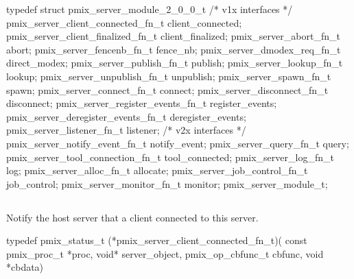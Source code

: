 \cspecificstart
\begin{codepar}
typedef struct pmix_server_module_2_0_0_t {
    /* v1x interfaces */
    pmix_server_client_connected_fn_t   client_connected;
    pmix_server_client_finalized_fn_t   client_finalized;
    pmix_server_abort_fn_t              abort;
    pmix_server_fencenb_fn_t            fence_nb;
    pmix_server_dmodex_req_fn_t         direct_modex;
    pmix_server_publish_fn_t            publish;
    pmix_server_lookup_fn_t             lookup;
    pmix_server_unpublish_fn_t          unpublish;
    pmix_server_spawn_fn_t              spawn;
    pmix_server_connect_fn_t            connect;
    pmix_server_disconnect_fn_t         disconnect;
    pmix_server_register_events_fn_t    register_events;
    pmix_server_deregister_events_fn_t  deregister_events;
    pmix_server_listener_fn_t           listener;
    /* v2x interfaces */
    pmix_server_notify_event_fn_t       notify_event;
    pmix_server_query_fn_t              query;
    pmix_server_tool_connection_fn_t    tool_connected;
    pmix_server_log_fn_t                log;
    pmix_server_alloc_fn_t              allocate;
    pmix_server_job_control_fn_t        job_control;
    pmix_server_monitor_fn_t            monitor;
} pmix_server_module_t;
\end{codepar}
\cspecificend


\subsection{}

\summary

Notify the host server that a client connected to this server.

\format

\cspecificstart
\begin{codepar}
typedef pmix_status_t (*pmix_server_client_connected_fn_t)(
                             const pmix_proc_t *proc,
                             void* server_object,
                             pmix_op_cbfunc_t cbfunc,
                             void *cbdata)
\end{codepar}
\cspecificend

\begin{arglist}
\end{arglist}

